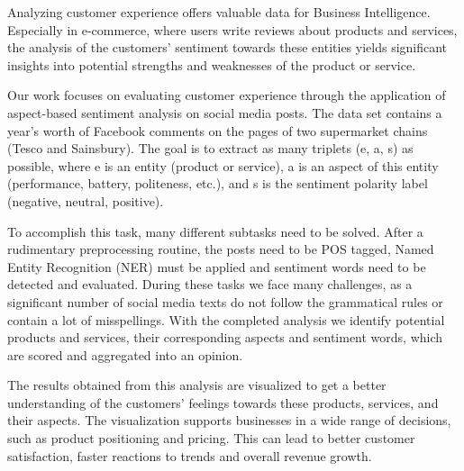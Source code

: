 Analyzing customer experience offers valuable data for Business Intelligence. Especially in e-commerce, where users write reviews about products and services, the analysis of the customers' sentiment towards these entities yields significant insights into potential strengths and weaknesses of the product or service.

Our work focuses on evaluating customer experience through the application of aspect-based sentiment analysis on social media posts. The data set contains a year's worth of Facebook comments on the pages of two supermarket chains (Tesco and Sainsbury). The goal is to extract as many triplets (e, a, s) as possible, where e is an entity (product or service), a is an aspect of this entity (performance, battery, politeness, etc.), and s is the sentiment polarity label (negative, neutral, positive).

To accomplish this task, many different subtasks need to be solved. After a rudimentary preprocessing routine, the posts need to be POS tagged, Named Entity Recognition (NER) must be applied and sentiment words need to be detected and evaluated. During these tasks we face many challenges, as a significant number of social media texts do not follow the grammatical rules or contain a lot of misspellings. With the completed analysis we identify potential products and services, their corresponding aspects and sentiment words, which are scored and aggregated into an opinion.

The results obtained from this analysis are visualized to get a better understanding of the customers' feelings towards these products, services, and their aspects. The visualization supports businesses in a wide range of decisions, such as product positioning and pricing. This can lead to better customer satisfaction, faster reactions to trends and overall revenue growth.